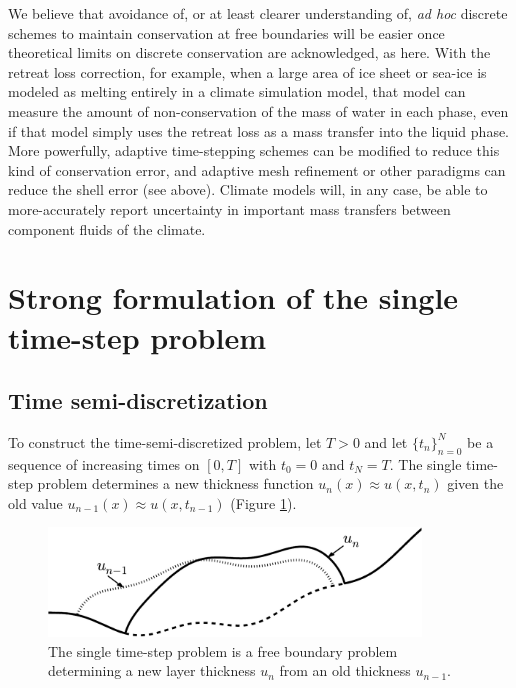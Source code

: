 \documentclass[final,leqno,onefignum,onetabnum]{siamltex1213bueler}
\begin{document}
We believe that avoidance of, or at least clearer understanding of, \emph{ad hoc} discrete schemes to maintain conservation at free boundaries will be easier once theoretical limits on discrete conservation are acknowledged, as here.  With the retreat loss correction, for example, when a large area of ice sheet or sea-ice is modeled as melting entirely in a climate simulation model, that model can measure the amount of non-conservation of the mass of water in each phase, even if that model simply uses the retreat loss as a mass transfer into the liquid phase.  More powerfully, adaptive time-stepping schemes can be modified to reduce this kind of conservation error, and adaptive mesh refinement or other paradigms can reduce the shell error (see above).  Climate models will, in any case, be able to more-accurately report uncertainty in important mass transfers between component fluids of the climate.



\section{Strong formulation of the single time-step problem}  \label{sec:strongform}

\subsection{Time semi-discretization}  \label{subsec:strongsingle}  To construct the time-semi-discretized problem, let $T>0$ and let $\{t_n\}_{n=0}^N$ be a sequence of increasing times on $[0,T]$ with $t_0=0$ and $t_N=T$.  The single time-step problem determines a new thickness function $u_n(x) \approx u(x,t_n)$ given the old value $u_{n-1}(x) \approx u(x,t_{n-1})$ (Figure \ref{fig:timestepcartoon}).

\begin{figure}[ht]
\begin{center}
\includegraphics[width=3.9in,keepaspectratio=true]{time-step-cartoon}
\end{center}
\caption{The single time-step problem is a free boundary problem determining a new layer thickness $u_n$ from an old thickness $u_{n-1}$.}
\label{fig:timestepcartoon}
\end{figure}
\end{document}
